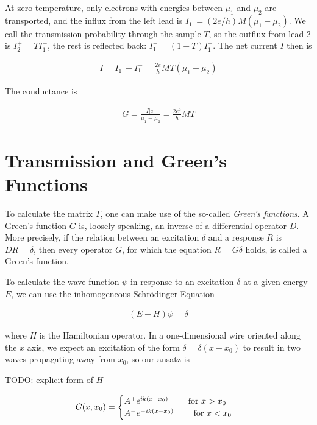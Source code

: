 \documentclass[11pt,twoside]{book}
\begin{document}
At zero temperature, only electrons with energies between $\mu_1$ and $\mu_2$
are transported, and the influx from the left lead is
$I_1^+ = (2e/h)M(\mu_1-\mu_2)$. We call the transmission probability through
the sample $T$, so the outflux from lead 2 is $I_2^+ = T I_1^+$, the rest
is reflected back: $I_1^- = (1-T) I_1^+$. The net current $I$ then is

\begin{align}
    I = I_1^+ - I_1^- = \frac{2e}{h} M T (\mu_1 - \mu_2)
\end{align}

The conductance is

\begin{align}
    G = \frac{I |e|}{\mu_1 - \mu_2} = \frac{2 e^2}{h} MT
\end{align}

\section{Transmission and Green's Functions}

To calculate the matrix $T$, one can make use of the so-called \emph{Green's
functions}. A Green's function $G$ is, loosely speaking, an inverse of a
differential operator $D$. More precisely, if the relation between an
excitation $\delta$ and a response $R$ is $D R = \delta$, then every
operator $G$, for
which the equation $R = G \delta$ holds, is called a Green's function.

To calculate the wave function $\psi$ in response to an excitation $\delta$ at a
given energy $E$, we can use the inhomogeneous Schrödinger Equation

\begin{align}
    \label{eq:green-define}
    (E - H) \psi = \delta
\end{align}

where $H$ is the Hamiltonian operator. In a one-dimensional wire oriented
along the $x$ axis, we expect an excitation of the form
$\delta = \delta(x - x_0)$ to result in two waves propagating away from $x_0$,
so our ansatz is

TODO: explicit form of $H$

\begin{align}
    G(x, x_0) = \begin{cases}
        A^+ e^{i k(x-x_0) } \qquad \textnormal{ for } x > x_0 \\
        A^- e^{-i k(x-x_0) } \qquad \textnormal{ for } x < x_0 \\
    \end{cases}
\end{align}
\end{document}
